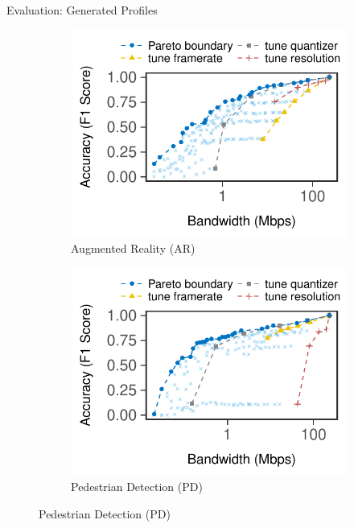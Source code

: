 \begin{frame}{Evaluation: Generated Profiles}
  \begin{figure}
    \centering
    \begin{subfigure}[t]{0.48\textwidth}
      \centering
      \caption{Augmented Reality (AR)}
      \label{fig:ar-profile}
      \includegraphics[width=\textwidth]{figures/profile-darknet.pdf}
    \end{subfigure}
    \hfill
    \begin{subfigure}[t]{0.48\textwidth}
      \centering
      \caption{Pedestrian Detection (PD)}
      \label{fig:pd-profile}
      \includegraphics[width=\textwidth]{figures/profile-mot.pdf}
    \end{subfigure}
  \end{figure}


\end{frame}
